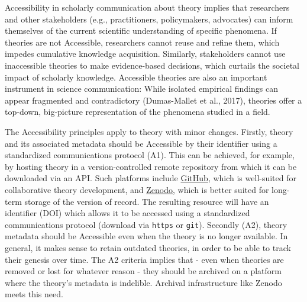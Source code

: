 \documentclass[
  man, noextraspace,floatsintext]{apa7}
\begin{document}
Accessibility in scholarly communication about theory implies that researchers and other stakeholders (e.g., practitioners, policymakers, advocates) can inform themselves of the current scientific understanding of specific phenomena.
If theories are not Accessible, researchers cannot reuse and refine them, which impedes cumulative knowledge acquisition.
Similarly, stakeholders cannot use inaccessible theories to make evidence-based decisions,
which curtails the societal impact of scholarly knowledge.
Accessible theories are also an important instrument in science communication:
While isolated empirical findings can appear fragmented and contradictory (Dumas-Mallet et al., 2017),
theories offer a top-down, big-picture representation of the phenomena studied in a field.

The Accessibility principles
apply to theory with minor changes.
Firstly, theory and its associated metadata should be Accessible by their identifier using a standardized communications protocol (A1).
This can be achieved, for example, by hosting theory in a version-controlled remote repository from which it can be downloaded via an API.
Such platforms include \href{https://github.com}{GitHub}, which is well-suited for collaborative theory development, and \href{https://zenodo.org}{Zenodo}, which is better suited for long-term storage of the version of record.
The resulting resource will have an identifier (DOI) which allows it to be accessed using a standardized communications protocol (download via \texttt{https} or \texttt{git}).
Secondly (A2), theory metadata should be Accessible even when the theory is no longer available.
In general, it makes sense to retain outdated theories,
in order to be able to track their genesis over time.
The A2 criteria implies that - even when theories are removed or lost for whatever reason - they should be archived on a platform where the theory's metadata is indelible.
Archival infrastructure like Zenodo meets this need.
\end{document}
